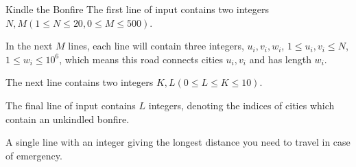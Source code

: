 \begin{problem}{Kindle the Bonfire}
The first line of input contains two integers $N, M (1 \le N \le 20,
0 \le M \le 500)$.

In the next $M$ lines, each line will contain three integers,
$u_i, v_i, w_i$, $1 \le u_i, v_i \le N$, $1 \le w_i \le 10^6$, which means
this road connects cities $u_i, v_i$ and has length $w_i$.

The next line contains two integers $K, L (0 \le L \le K \le 10)$. 

The final line of input contains $L$ integers, denoting the indices of cities
which contain an unkindled bonfire.
\OutputFile

A single line with an integer giving the longest distance you need to travel
in case of emergency.

\Examples

\begin{example}
%
%
\end{example}
\end{problem}
